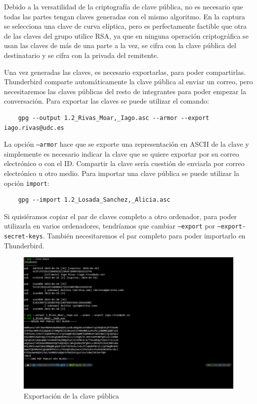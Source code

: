 Debido a la versatilidad de la criptografía de clave pública, no es necesario que todas las partes tengan claves generadas con el mismo algoritmo. En la captura se selecciona una clave de curva elíptica, pero es perfectamente factible que otra de las claves del grupo utilice RSA, ya que en ninguna operación criptográfica se usan las claves de más de una parte a la vez, se cifra con la clave pública del destinatario y se cifra con la privada del remitente.

Una vez generadas las claves, es necesario exportarlas, para poder compartirlas. Thunderbird comparte automáticamente la clave pública al enviar un correo, pero necesitaremos las claves públicas del resto de integrantes para poder empezar la conversación. Para exportar las claves se puede utilizar el comando:

\begin{verbatim}
    gpg --output 1.2_Rivas_Moar,_Iago.asc --armor --export iago.rivas@udc.es
\end{verbatim}

La opción \texttt{--armor} hace que se exporte una representación en ASCII de la clave y simplemente es necesario indicar la clave que se quiere exportar por su correo electrónico o con el ID. Compartir la clave sería cuestión de enviarla por correo electrónico u otro medio. Para importar una clave pública se puede utilizar la opción \texttt{import}:

\begin{verbatim}
    gpg --import 1.2_Losada_Sanchez,_Alicia.asc
\end{verbatim}

Si quisiéramos copiar el par de claves completo a otro ordenador, para poder utilizarla en varios ordenadores, tendríamos que cambiar \texttt{--export} por \texttt{--export-secret-keys}. También necesitaremos el par completo para poder importarlo en Thunderbird.

\begin{figure}[H]
    \centering
    \includegraphics[width=\textwidth]{gpg-export.png}
    \caption{Exportación de la clave pública}
\end{figure}

